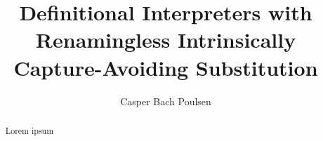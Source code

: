 \documentclass[12pt,a4paper]{article}
\title{Definitional Interpreters with\\Renamingless Intrinsically Capture-Avoiding Substitution}
\author{Casper Bach Poulsen}
\date{}
\begin{document}
\maketitle

\begin{abstract}
  Lorem ipsum
\end{abstract}











\end{document}

